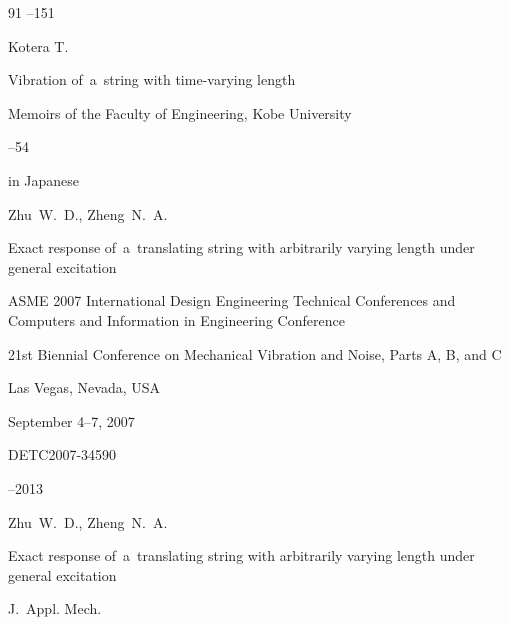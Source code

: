 \begin{thebibliography}{91}
--151











\by Kotera T.

\paper Vibration of~a~string with time-varying length

\serial Memoirs of the Faculty of Engineering, Kobe University



--54

\lang in Japanese






\by Zhu~W.~D., Zheng~N.~A.

\paper Exact response of~a~translating string with arbitrarily varying length under general excitation

\inbook ASME 2007 International Design Engineering Technical Conferences and Computers and Information in Engineering Conference


\volinfo 21st Biennial Conference on Mechanical Vibration and Noise, Parts A, B, and C

\publaddr Las Vegas, Nevada, USA

\procinfo September 4–7, 2007


\papernumber DETC2007-34590

--2013






\by Zhu~W.~D., Zheng~N.~A.

\paper Exact response of~a~translating string with arbitrarily varying length under general excitation

\jour J.~Appl. Mech.






\end{thebibliography}
